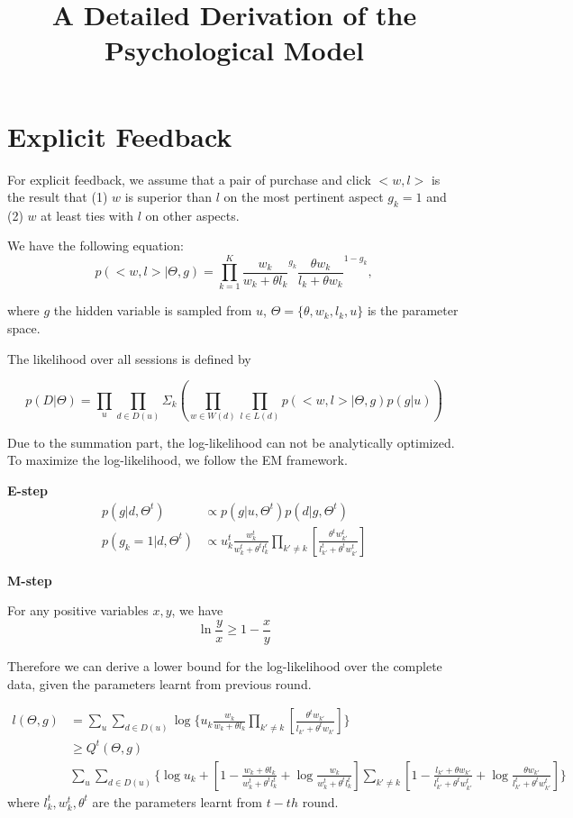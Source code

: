 \documentclass{article}
\title{A Detailed Derivation of the Psychological Model}
\begin{document}
\section{Explicit Feedback}
For explicit feedback, we assume that a pair of purchase and click $<w,l>$ is the result that (1) $w$ is superior than $l$ on the most pertinent aspect $g_k=1$ and (2) $w$ at least ties with $l$ on other aspects. 

We have the following equation: 
\begin{equation}
p(<w,l>|\Theta,g) = \prod_{k=1}^K {\frac{w_k}{w_k+\theta l_k}}^{g_k} {\frac{\theta w_k}{l_k + \theta w_k}}^{1-g_k},
\end{equation} 
 
where $g$ the hidden variable is sampled from $u$, $\Theta=\{\theta,w_k,l_k, u\}$ is the parameter space.

The likelihood over all sessions is defined by

\begin{equation}\label{equ:likelihood}
p(D|\Theta)= \prod _u \prod_{d\in D(u)} \Sigma_k (\prod_{w\in W(d)} \prod_{l \in L(d)} p(<w,l>|\Theta,g) p(g|u))
\end{equation} 

Due to the summation part, the log-likelihood can not be analytically optimized. To maximize the log-likelihood, we follow the EM framework.

\textbf{E-step} 
\begin{eqnarray}
p(g|d,\Theta^{t}) & \propto   p(g|u,\Theta^{t}) p(d|g,\Theta^{t}) \\ \nonumber
 p(g_k=1|d,\Theta^{t}) & \propto  u_k^{t} \frac{w_{k}^t} {w_{k}^t+\theta^t l_{k}^t} \prod_{k'\neq k}  [\frac{\theta^t w_{k'}^t} {l_{k'}^t + \theta^t w_{k'}^t}]
\end{eqnarray} 

\textbf{M-step} 

For any positive variables $x,y$, we have
\begin{equation*}
\ln \frac{y}{x} \geq 1- \frac{x}{y}
\end{equation*}

Therefore we can derive a lower bound for the log-likelihood over the complete data, given the parameters learnt from previous round. 

\begin{eqnarray}
l(\Theta,g) & = \sum_u \sum_{d\in D(u)} \log \{ u_k  \frac{w_{k}} {w_{k}+\theta l_{k}} \prod_{k'\neq k}  [\frac{\theta^t w_{k'}} {l_{k'} + \theta^t w_{k'}}] \} \\\nonumber
& \geq  Q^t(\Theta,g)\\\nonumber
& \sum_u \sum_{d\in D(u)} \{\log  u_k  + [ 1- \frac{w_k+\theta l_k}{ w_k^t + \theta^t l_k^t}  + \log \frac{w_{k}} {w_{k}^t+\theta ^t l_{k}^t} ] \sum_{k'\neq k}  [ 1- \frac{ l_{k'}+\theta w_{k'}}{ l_{k'}^t+\theta^t w_{k'}^t}  + \log \frac{\theta w_{k'}} {l_{k'}^t+\theta ^t w_{k'}^t} ] \}
\end{eqnarray}
 where $l_k^t, w_k^t,\theta^t$ are the parameters learnt from $t-th$ round.
  
\end{document}
